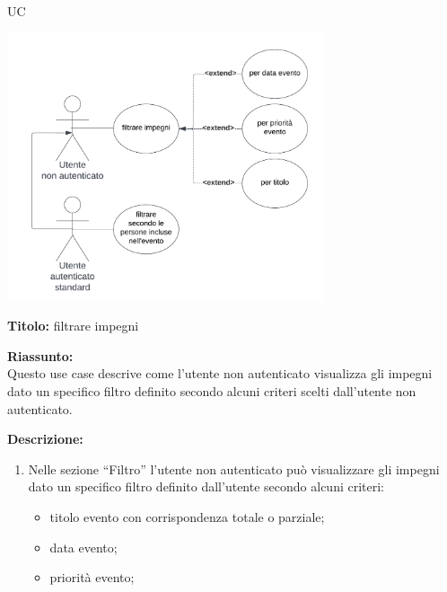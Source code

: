 \begin{listaPersonale}{UC}
    \newpage


    \begin{center}
        \includegraphics[width=0.7\textwidth]{img/Diagrammi/UseCases/Filtro.png}
    \end{center}
    \begin{listaPersonale2}[UC] {}
            \textbf{Titolo:} filtrare impegni

            \textbf{Riassunto:} \\
            Questo use case descrive come l'utente non autenticato visualizza gli impegni dato un specifico filtro definito secondo alcuni criteri scelti dall'utente non autenticato.

            \textbf{Descrizione:}
            \begin{enumerate}
                \item Nelle sezione “Filtro” l'utente non autenticato può visualizzare gli impegni dato un specifico filtro definito dall'utente secondo alcuni criteri:
                      \begin{itemize}
                          \item titolo evento con corrispondenza totale o parziale;
                          \item data evento;
                          \item priorità evento;
                      \end{itemize}


\end{enumerate}
\end{listaPersonale2}
\end{listaPersonale}
